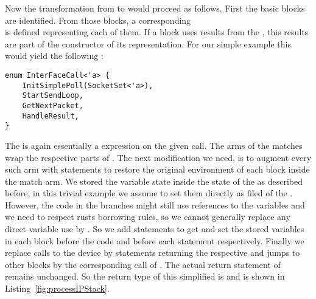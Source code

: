 Now the transformation from  to  would proceed as follows. First the basic blocks are identified. From those blocks, a corresponding\\  is defined representing each of them. If a block uses results from the \dev{}, this results are part of the constructor of its  representation. For our simple example this would yield the following :

\begin{verbatim}
enum InterFaceCall<'a> {
    InitSimplePoll(SocketSet<'a>),
    StartSendLoop,
    GetNextPacket,
    HandleResult,
}
\end{verbatim}

The  is again essentially a  expression on the given call. The arms of the matches wrap the respective parts of . The next modification we need, is to augment every such arm with statements to restore the original environment of each block inside the match arm. We stored the variable state inside the state of the \stack{} as described before, in this trivial example we assume to set them directly as filed of the \stack{}. However, the code in the branches might still use references to the variables and we need to respect rusts borrowing rules, so we cannot generally replace any direct variable use  by . So we add statements to get and set the stored variables in each block before the code and before each  statement respectively. Finally we replace calls to the device by statements returning the respective  and jumps to other blocks by the corresponding call of . The actual return statement of  remains unchanged. So the return type of this simplified  is  and is shown in Listing~\ref{fig:processIPStack}. 

